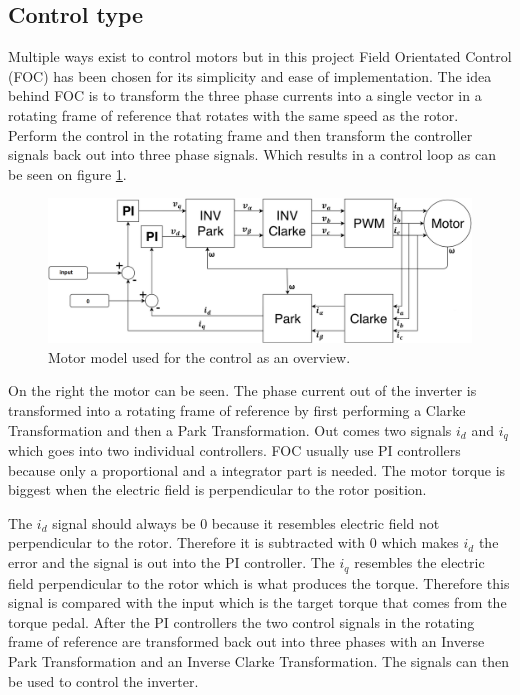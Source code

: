 

\subsection{Control type}
Multiple ways exist to control motors but in this project Field Orientated Control (FOC) has been chosen for its simplicity and ease of implementation. The idea behind FOC is to transform the three phase currents into a single vector in a rotating frame of reference that rotates with the same speed as the rotor. Perform the control in the rotating frame and then transform the controller signals back out into three phase signals. Which results in a control loop as can be seen on figure \ref{fig:Motor_model}.

\begin{figure} [H]
    \centering
    \includegraphics[scale=0.42]{pictures/control/udklip.PNG}
    \caption{Motor model used for the control as an overview.}
    \label{fig:Motor_model}
\end{figure} 

On the right the motor can be seen. The phase current out of the inverter is transformed into a rotating frame of reference by first performing a Clarke Transformation and then a Park Transformation. Out comes two signals $i_d$ and $i_q$ which goes into two individual controllers. FOC usually use PI controllers because only a proportional and a integrator part is needed.
The motor torque is biggest when the electric field is perpendicular to the rotor position.

The $i_d$ signal should always be $0$ because it resembles electric field not perpendicular to the rotor. Therefore it is subtracted with $0$ which makes $i_d$ the error and the signal is out into the PI controller. 
The $i_q$ resembles the electric field perpendicular to the rotor which is what produces the torque. Therefore this signal is compared with the input which is the target torque that comes from the torque pedal. After the PI controllers the two control signals in the rotating frame of reference are transformed back out into three phases with an Inverse Park Transformation and an Inverse Clarke Transformation. The signals can then be used to control the inverter.



